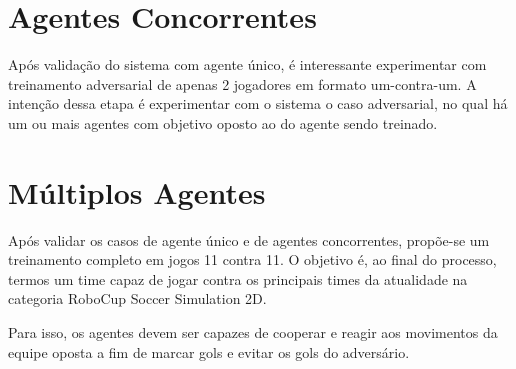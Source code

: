 \section{Agentes Concorrentes}

Após validação do sistema com agente único, é interessante experimentar com treinamento adversarial de apenas 2 jogadores em formato um-contra-um. A intenção dessa etapa é experimentar com o sistema o caso adversarial, no qual há um ou mais agentes com objetivo oposto ao do agente sendo treinado.

\section{Múltiplos Agentes}

Após validar os casos de agente único e de agentes concorrentes, propõe-se um treinamento completo em jogos 11 contra 11. O objetivo é, ao final do processo, termos um time capaz de jogar contra os principais times da atualidade na categoria RoboCup Soccer Simulation 2D.

Para isso, os agentes devem ser capazes de cooperar e reagir aos movimentos da equipe oposta a fim de marcar gols e evitar os gols do adversário.
